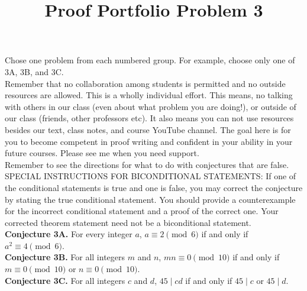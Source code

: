 \documentclass{article}  %
\title{Proof Portfolio Problem 3}
\author{}
\date{}
\begin{document}
\maketitle

Chose one problem from each numbered group.  For example, choose only one of 3A, 3B, and 3C.\\

Remember that no collaboration among students is permitted and no outside resources are allowed. This is a wholly individual effort.  This means, no talking with others in our class (even about what problem you are doing!), or outside of our class (friends, other professors etc).  It also means you can not use resources besides our text, class notes, and course YouTube channel. The goal here is for you to become competent in proof writing and confident in your ability in your future courses.  Please see me when you need support.\\

Remember to see the directions for what to do with conjectures that are false.  \\

SPECIAL INSTRUCTIONS  FOR BICONDITIONAL STATEMENTS:  If one of the conditional statements is true and one is false, you may correct the conjecture by stating the true conditional statement. You should provide a counterexample for the incorrect conditional statement and a proof of the correct one. Your corrected theorem statement need not be a biconditional statement.\\



\noindent\textbf{Conjecture 3A.}   For every integer $a$, $a\equiv 2 \pmod{6}$ if and only if $a^2 \equiv 4 \pmod{6}$.\\

\noindent\textbf{Conjecture 3B.}  For all integers $m$ and $n$, $mn \equiv 0 \pmod{10}$ if and only if $m \equiv 0 \pmod{10}$ or $n \equiv 0 \pmod{10}$.\\

\noindent\textbf{Conjecture 3C.} For all integers $c$ and $d$, $45\mid cd$ if and only if $45\mid c$ or $45\mid d$.
\end{document}
